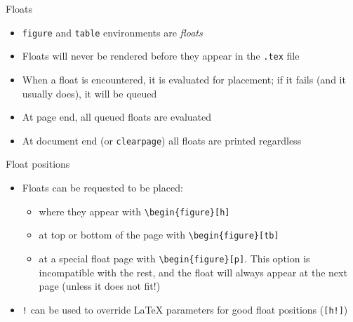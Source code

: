 \documentclass[english]{beamer}
\let\olditem\item
\renewcommand{\item}{\setlength{\itemsep}{\fill}\olditem}
\newenvironment{sitemize}{\let\item\olditem \begin{itemize}}{\vfill\end{itemize}}
\let\textttt\texttt
\renewcommand{\texttt}[1]{\colorbox{gray!10}{\textttt{#1}}}
\begin{document}
\begin{frame}{Floats}
    \begin{itemize}
        \item \texttt{figure} and \texttt{table} environments are \textit{floats}
            \item Floats will never be rendered before they appear in the \texttt{.tex} file
            \item When a float is encountered, it is evaluated for placement; if it fails (and it usually does), it will be queued
            \item At page end, all queued floats are evaluated
            \item At document end (or \texttt{clearpage}) all floats are printed regardless
    \end{itemize}
\end{frame}

\begin{frame}[fragile]{Float positions}
    \begin{itemize}
        \item Floats can be requested to be placed:
        \begin{sitemize}
            \item where they appear with \verb|\begin{figure}[h]|
            \item at top or bottom of the page with \verb|\begin{figure}[tb]|
            \item at a special float page with \verb|\begin{figure}[p]|. This option is incompatible with the rest, and the float will always appear at the next page (unless it does not fit!)
        \end{sitemize} 
        \item \texttt{!} can be used to override \LaTeX{} parameters for good float positions (\texttt{[h!]})
    \end{itemize}
\end{frame}
\end{document}
